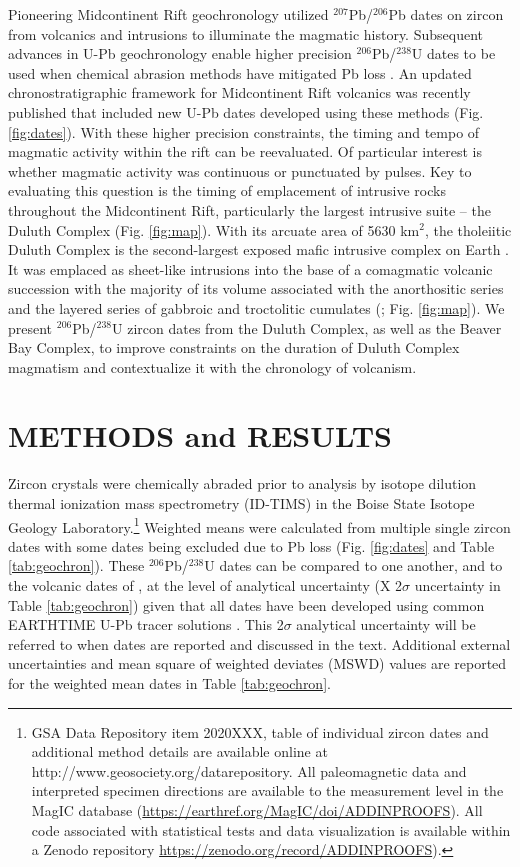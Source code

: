 \documentclass[11pt,letterpaper]{article}
\begin{document}
Pioneering Midcontinent Rift geochronology utilized $^{207}$Pb/$^{206}$Pb dates on zircon from volcanics \citep{Davis1997a} and intrusions \citep{Paces1993a} to illuminate the magmatic history. Subsequent advances in U-Pb geochronology enable higher precision $^{206}$Pb/$^{238}$U dates to be used when chemical abrasion methods have mitigated Pb loss \citep{Mattinson2005a}. An updated chronostratigraphic framework for Midcontinent Rift volcanics was recently published \citep{Swanson-Hysell2019a} that included new U-Pb dates developed using these methods (Fig. \ref{fig:dates}). With these higher precision constraints, the timing and tempo of magmatic activity within the rift can be reevaluated. Of particular interest is whether magmatic activity was continuous or punctuated by pulses. Key to evaluating this question is the timing of emplacement of intrusive rocks throughout the Midcontinent Rift, particularly the largest intrusive suite -- the Duluth Complex (Fig. \ref{fig:map}). With its arcuate area of 5630 km$^2$, the tholeiitic Duluth Complex is the second-largest exposed mafic intrusive complex on Earth \citep{Miller2002c}. It was emplaced as sheet-like intrusions into the base of a comagmatic volcanic succession with the majority of its volume associated with the anorthositic series and the layered series of gabbroic and troctolitic cumulates (\citealp{Miller2002c}; Fig. \ref{fig:map}). We present $^{206}$Pb/$^{238}$U zircon dates from the Duluth Complex, as well as the Beaver Bay Complex, to improve constraints on the duration of Duluth Complex magmatism and contextualize it with the chronology of volcanism.

\section*{METHODS and RESULTS}

Zircon crystals were chemically abraded prior to analysis by isotope dilution thermal ionization mass spectrometry (ID-TIMS) in the Boise State Isotope Geology Laboratory.\footnote{GSA Data Repository item 2020XXX, table of individual zircon dates and additional method details are available online at http://www.geosociety.org/datarepository. All paleomagnetic data and interpreted specimen directions are available to the measurement level in the MagIC database (\url{https://earthref.org/MagIC/doi/ADDINPROOFS}).  All code associated with statistical tests and data visualization is available within a Zenodo repository \url{https://zenodo.org/record/ADDINPROOFS}).} Weighted means were calculated from multiple single zircon dates with some dates being excluded due to Pb loss (Fig. \ref{fig:dates} and Table \ref{tab:geochron}). These $^{206}$Pb/$^{238}$U dates can be compared to one another, and to the volcanic dates of \cite{Swanson-Hysell2019a}, at the level of analytical uncertainty (X 2$\sigma$ uncertainty in Table \ref{tab:geochron}) given that all dates have been developed using common EARTHTIME U-Pb tracer solutions \citep{Condon2015a}. This 2$\sigma$ analytical uncertainty will be referred to when dates are reported and discussed in the text. Additional external uncertainties and mean square of weighted deviates (MSWD) values are reported for the weighted mean dates in Table \ref{tab:geochron}.
\end{document}
